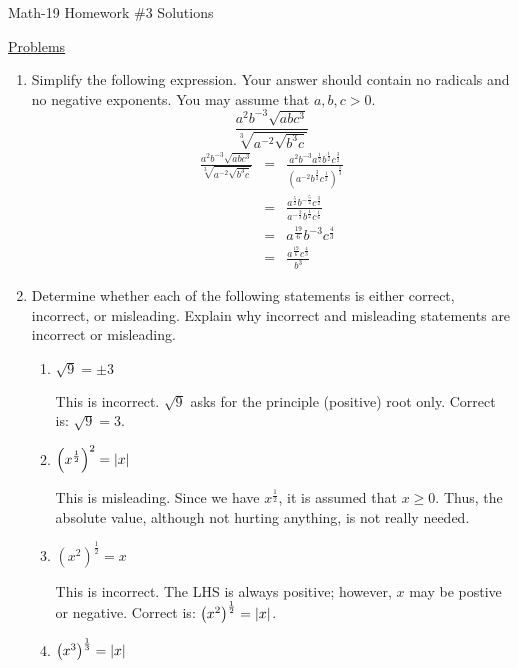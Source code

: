 \documentclass[letterpaper,12pt,fleqn]{article}
\begin{document}
\begin{center}
\Large Math-19 Homework \#3 Solutions
\end{center}

\vspace{0.5in}

\underline{Problems}

\begin{enumerate}
\item Simplify the following expression. Your answer should contain no
  radicals and no negative exponents. You may assume that $a,b,c>0$.
  \[\frac{a^2b^{-3}\sqrt{abc^3}}{\sqrt[3]{a^{-2}\sqrt{b^3c}}}\]
  \begin{eqnarray*}
    \frac{a^2b^{-3}\sqrt{abc^3}}{\sqrt[3]{a^{-2}\sqrt{b^3c}}} &=&
    \frac{a^2b^{-3}a^{\frac{1}{2}}b^{\frac{1}{2}}c^{\frac{3}{2}}}
         {(a^{-2}b^{\frac{3}{2}}c^{\frac{1}{2}})^{\frac{1}{3}}} \\
         &=& \frac{a^{\frac{5}{2}}b^{-\frac{5}{2}}c^{\frac{3}{2}}}
         {a^{-\frac{2}{3}}b^{\frac{1}{2}}c^{\frac{1}{6}}} \\
         &=& a^{\frac{19}{6}}b^{-3}c^{\frac{4}{3}} \\
         &=& \frac{a^{\frac{19}{6}}c^{\frac{4}{3}}}{b^3}
  \end{eqnarray*}

\item Determine whether each of the following statements is either correct,
  incorrect, or misleading. Explain why incorrect and misleading statements are
  incorrect or misleading.
  \begin{enumerate}
  \item $\sqrt{9}=\pm3$

    This is incorrect. $\sqrt{9}$ asks for the principle (positive) root only.
    Correct is: $\sqrt{9}=3$.
      
  \item $\left(x^{\frac{1}{2}}\right)^2=\lvert x\rvert$

    This is misleading. Since we have $x^{\frac{1}{2}}$, it is assumed that
    $x\ge0$. Thus, the absolute value, although not hurting anything, is
    not really needed.
      
  \item $\left(x^2\right)^{\frac{1}{2}}=x$

    This is incorrect. The LHS is always positive; however, $x$ may be postive
    or negative. Correct is: $\left(x^2\right)^{\frac{1}{2}}=\lvert x\rvert$.
    
  \item $\left(x^3\right)^{\frac{1}{3}}=\lvert x\rvert$


\end{enumerate}
\end{enumerate}
\end{document}

